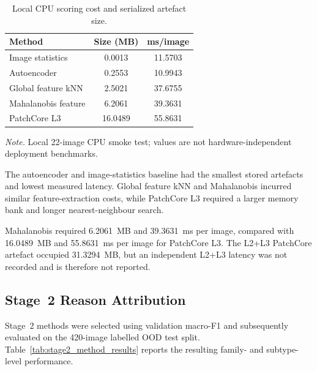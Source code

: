 \documentclass[fleqn,12pt]{olplainarticle}
\begin{document}
\begin{table}[H]
    \centering
    \caption[Local runtime and artefact size.]
    {Local CPU scoring cost and serialized artefact size.}
    \label{tab:runtime_results}
    \footnotesize
    \setlength{\tabcolsep}{4.5pt}
    \renewcommand{\arraystretch}{1.01}
    \begin{tabularx}{0.66\textwidth}{@{}
        >{\raggedright\arraybackslash}X
        S[table-format=2.4]
        S[table-format=2.4]
    @{}}
        \toprule
        \textbf{Method} &
        {\textbf{Size (MB)}} &
        {\textbf{ms/image}} \\
        \midrule
        Image statistics & 0.0013 & 11.5703 \\
        Autoencoder & 0.2553 & 10.9943 \\
        Global feature kNN & 2.5021 & 37.6755 \\
        Mahalanobis feature & 6.2061 & 39.3631 \\
        PatchCore L3 & 16.0489 & 55.8631 \\
        \bottomrule
    \end{tabularx}
    \vspace{0.1em}
    \parbox{0.66\textwidth}{\scriptsize
    \emph{Note.} Local 22-image CPU smoke test; values are not
    hardware-independent deployment benchmarks.}
\end{table}

The autoencoder and image-statistics baseline had the smallest stored
artefacts and lowest measured latency. Global feature kNN and Mahalanobis
incurred similar feature-extraction costs, while PatchCore L3 required a
larger memory bank and longer nearest-neighbour search.

Mahalanobis required 6.2061~MB and 39.3631~ms per image, compared with
16.0489~MB and 55.8631~ms per image for PatchCore L3. The L2+L3 PatchCore
artefact occupied 31.3294~MB, but an independent L2+L3 latency was not
recorded and is therefore not reported.

\subsection{Stage~2 Reason Attribution}
\label{subsec:stage2_method_results}
\label{subsec:stage2_family_results}
\label{subsec:stage2_subtype_results}

Stage~2 methods were selected using validation macro-F1 and subsequently
evaluated on the 420-image labelled OOD test split.
Table~\ref{tab:stage2_method_results} reports the resulting family- and
subtype-level performance.
\end{document}
